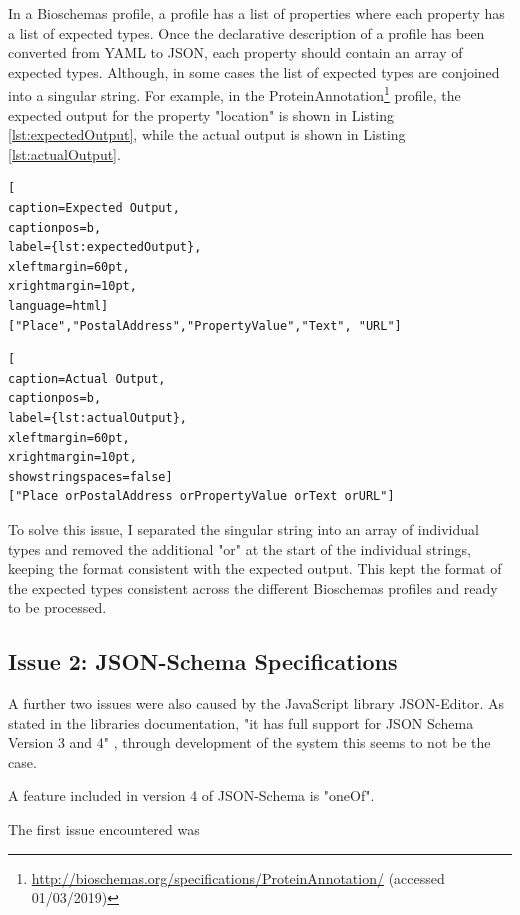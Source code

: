 In a Bioschemas profile, a profile has a list of properties where each property has a list of expected types. Once the declarative description of a profile has been converted from YAML to JSON, each property should contain an array of expected types. Although, in some cases the list of expected types are conjoined into a singular string. For example, in the ProteinAnnotation\footnote{\url{http://bioschemas.org/specifications/ProteinAnnotation/} (accessed 01/03/2019)} profile, the expected output for the property "location" is shown in Listing \ref{lst:expectedOutput}, while the actual output is shown in Listing \ref{lst:actualOutput}.

\begin{lstlisting}[
caption=Expected Output,
captionpos=b,
label={lst:expectedOutput},
xleftmargin=60pt,
xrightmargin=10pt,
language=html]
["Place","PostalAddress","PropertyValue","Text", "URL"]
\end{lstlisting}

\begin{center}
\begin{lstlisting}[
caption=Actual Output,
captionpos=b,
label={lst:actualOutput},
xleftmargin=60pt,
xrightmargin=10pt,
showstringspaces=false]
["Place orPostalAddress orPropertyValue orText orURL"]
\end{lstlisting}  
\end{center}

To solve this issue, I separated the singular string into an array of individual types and removed the additional "or" at the start of the individual strings, keeping the format consistent with the expected output. This kept the format of the expected types consistent across the different Bioschemas profiles and ready to be processed.

\newpage
\subsection{Issue 2: JSON-Schema Specifications}
A further two issues were also caused by the JavaScript library JSON-Editor. As stated in the libraries documentation, "it has full support for JSON Schema Version 3 and 4" \cite{jsonEditor}, through development of the system this seems to not be the case.

A feature included in version 4 of JSON-Schema is "oneOf"\cite{jsonSchemaV4}.

The first issue encountered was   


